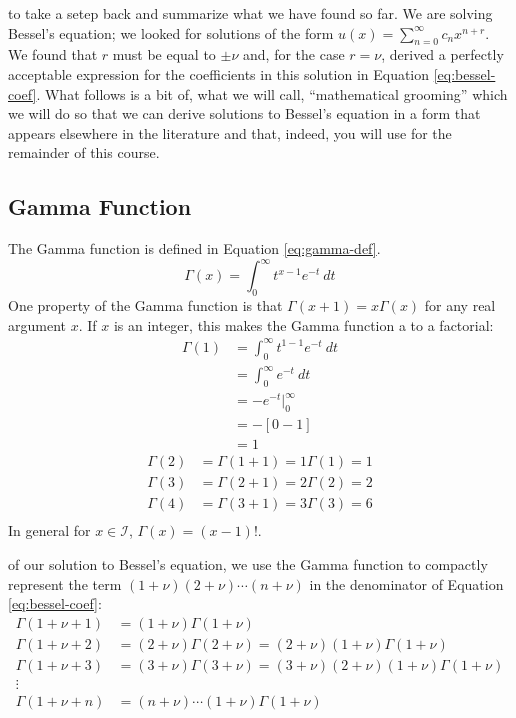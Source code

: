  to take a setep back and summarize what we have found so far.  We are solving Bessel's equation; we looked for solutions of the form $u(x)=\sum_{n=0}^{\infty} c_n x^{n+r}$.  We found that $r$ must be equal to $\pm \nu$ and, for the case $r = \nu$, derived a perfectly acceptable expression for the coefficients in this solution in Equation \ref{eq:bessel-coef}. What follows is a bit of, what we will call, ``mathematical grooming'' which we will do so that we can derive solutions to Bessel's equation in a form that appears elsewhere in the literature and that, indeed, you will use for the remainder of this course.
\subsection{Gamma Function}
The Gamma function is defined in Equation \ref{eq:gamma-def}.
\begin{equation}
\Gamma(x) = \int_0^{\infty} t^{x-1}e^{-t} \ dt
\label{eq:gamma-def}
\end{equation}
One property of the Gamma function is that $\Gamma(x+1) = x \Gamma(x)$ for any real argument $x$. If $x$ is an integer, this makes the Gamma function a to a factorial: 
\begin{align*}
\Gamma(1) &= \int_0^{\infty}t^{1-1} e^{-t} \ dt \\
&= \int_0^{\infty}e^{-t} \ dt \\
&= -e^{-t}\Bigr|_0^{\infty} \\
&= -[0 - 1] \\
&= 1
\end{align*}
\begin{align*}
\Gamma(2) &= \Gamma(1+1) = 1\Gamma(1) = 1 \\
\Gamma(3) &= \Gamma(2+1) = 2\Gamma(2) = 2 \\
\Gamma(4) &= \Gamma(3+1) = 3\Gamma(3) = 6 \\
\end{align*}
In general for $x \in \mathcal{I}$, $\Gamma(x) = (x-1)!$. 

 of our solution to Bessel's equation, we use the Gamma function to compactly represent the term $(1+\nu)(2+\nu)\cdots(n+\nu)$ in the denominator of Equation \ref{eq:bessel-coef}:
\begin{align*}
\Gamma(1+\nu+1) &= (1+\nu)\Gamma(1+\nu) \\
\Gamma(1+\nu+2) &= (2+\nu)\Gamma(2+\nu) = (2+\nu)(1+\nu)\Gamma(1+\nu) \\
\Gamma(1+\nu+3) &= (3+\nu)\Gamma(3+\nu) = (3+\nu)(2+\nu)(1+\nu)\Gamma(1+\nu) \\
\vdots \\
\Gamma(1+\nu+n) &= (n+\nu)\cdots(1+\nu)\Gamma(1+\nu)
\end{align*}

